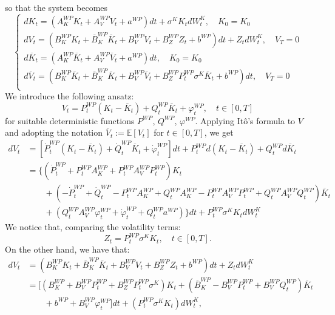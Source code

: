 \documentclass[11pt,twoside]{amsart}
\theoremstyle{definition}
\numberwithin{equation}{section}
\newcommand{\E}{\mathbb{E}}
\renewcommand{\bar}{\overline}
\begin{document}
so that the system becomes
\begin{equation*}
    \begin{cases}
        dK_t = (A^{WP}_K K_t + A^{WP}_V V_t + a^{WP}) dt + \sigma^KK_t dW^K_t,\quad K_0=K_0\\
        dV_t = (B^{WP}_K K_t + \bar{B}^{WP}_K \bar{K}_t + B^{WP}_V V_t + B^{WP}_Z Z_t + b^{WP}) dt + Z_t dW^K_t, \quad V_T=0\\
        d\bar{K}_t = (A^{WP}_K \bar{K}_t + A^{WP}_V \bar{V}_t + a^{WP}) dt,\quad K_0=K_0\\
        d\bar{V}_t = (B^{WP}_K \bar{K}_t + \bar{B}^{WP}_K \bar{K}_t + B^{WP}_V \bar{V}_t + B^{WP}_Z P^{WP}_t \sigma^K \bar{K}_t + b^{WP}) dt, \quad V_T=0\\
    \end{cases}
\end{equation*}
We introduce the following ansatz:
\begin{equation*}
    V_t = P^{WP}_t (K_t - \bar{K}_t) + Q^{WP}_t \bar{K}_t + \varphi^{WP}_t, \quad t\in[0,T]
\end{equation*}
for suitable deterministic functions $P^{WP}$, $Q^{WP}$, $\varphi^{WP}$. Applying It\^o's formula to $V$ and adopting the notation $\bar{V}_t := \E [V_t ]$ for $t \in[0,T]$, we get
\begin{align*}
    dV_t &= [\dot{P}^{WP}_t (K_t - \bar{K}_t) + \dot{Q}^{WP}_t \bar{K}_t + \dot{\varphi}^{WP}_t ]dt + P^{WP}_t d(K_t - \bar{K}_t) + Q^{WP}_t d\bar{K}_t\\
    &= \{ (\dot{P}^{WP}_t + P^{WP}_t A^{WP}_K + P^{WP}_tA^{WP}_V P^{WP}_t)K_t\\
    &\qquad + (-\dot{P}^{WP}_t + \dot{Q}^{WP}_t - P^{WP}_t A^{WP}_K + Q^{WP}_t A^{WP}_K - P^{WP}_t A^{WP}_V P^{WP}_t + Q^{WP}_tA^{WP}_VQ^{WP}_t) \bar{K}_t\\
    &\qquad +(Q^{WP}_t A^{WP}_V \varphi^{WP}_t + \dot{\varphi}^{WP}_t+ Q^{WP}_t a^{WP})\} dt + P^{WP}_t \sigma^K K_t dW^K_t
\end{align*}
We notice that, comparing the volatility terms:
\begin{equation*}
    Z_t = P^{WP}_t \sigma^KK_t,\quad t\in[0,T].
\end{equation*}
On the other hand, we have that:
\begin{align*}
    dV_t &= (B^{WP}_K K_t + \bar{B}^{WP}_K \bar{K}_t + B^{WP}_V V_t + B^{WP}_Z Z_t + b^{WP}) dt + Z_t dW^K_t\\
    &= [(B^{WP}_K + B^{WP}_VP^{WP}_t + B^{WP}_Z P^{WP}_t \sigma^K)K_t+(\bar{B}^{WP}_K - B^{WP}_V P^{WP}_t + B^{WP}_VQ^{WP}_t) \bar{K}_t\\
    &\qquad+ b^{WP} + B^{WP}_V\varphi^{WP}_t]dt + (P^{WP}_t \sigma^KK_t)  dW^K_t,
\end{align*}
\end{document}
